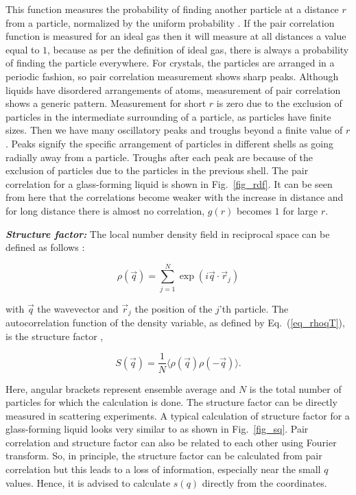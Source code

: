     This function measures the probability of finding another particle at a distance $r$ from a particle, normalized by the uniform probability \cite{hansen2013,binder2011glassy}. If the pair correlation function is measured for an ideal gas then it will measure at all distances a value equal to $1$, because as per the definition of ideal gas, there is always a probability of finding the particle everywhere. For crystals, the particles are arranged in a periodic fashion, so pair correlation measurement shows sharp peaks. Although liquids have disordered arrangements of atoms, measurement of pair correlation shows a generic pattern. Measurement for short $r$ is zero due to the exclusion of particles in the intermediate surrounding of a particle, as particles have finite sizes. Then we have many oscillatory peaks and troughs beyond a finite value of $r$. Peaks signify the specific arrangement of particles in different shells as going radially away from a particle. Troughs after each peak are because of the exclusion of particles due to the particles in the previous shell. The pair correlation for a glass-forming liquid is shown in Fig.~\ref{fig_rdf}. It can be seen from here that the correlations become weaker with the increase in distance and for long distance there is almost no correlation, $g(r)$ becomes $1$ for large $r$.
    
    {\bf \em Structure factor:} The local number density field in reciprocal space can be defined as follows \cite{hansen2013}:

    \begin{equation}
        \rho (\vec{q}) = \sum_{j=1}^{N} \exp \left( i \vec{q} \cdot {\vec{r}_j} \right)
        \label{eq_rhoqT}
    \end{equation}

    with $\vec{q}$ the wavevector and {$\vec{r}_j$} the position of the $j$'th particle. The autocorrelation function of the density variable, as defined by Eq.~(\ref{eq_rhoqT}), is the structure factor \cite{hansen2013,binder2011glassy},
    
    \begin{equation}
        S(\vec{q}) = \frac{1}{N} \langle \rho (\vec{q}) \rho (-\vec{q}) \rangle.
    \end{equation}
    
    Here, angular brackets represent ensemble average and $N$ is the total number of particles for which the calculation is done. The structure factor can be directly measured in scattering experiments. A typical calculation of structure factor for a glass-forming liquid looks very similar to as shown in Fig.~\ref{fig_sq}. Pair correlation and structure factor can also be related to each other using Fourier transform. So, in principle, the structure factor can be calculated from pair correlation but this leads to a loss of information, especially near the small $q$ values. Hence, it is advised to calculate $s(q)$ directly from the coordinates.
    
